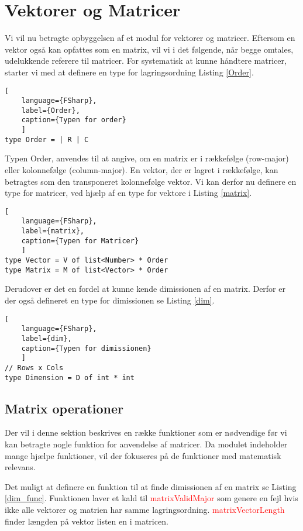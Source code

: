 \section{Vektorer og Matricer}
Vi vil nu betragte opbyggelsen af et modul for vektorer og matricer. Eftersom en vektor også kan opfattes som en matrix, vil vi i det følgende, når begge omtales, udelukkende referere til matricer. For systematisk at kunne håndtere matricer, starter vi med at definere en type for lagringsordning Listing \ref{Order}.

\begin{lstlisting}[
    language={FSharp}, 
    label={Order}, 
    caption={Typen for order}
    ]
type Order = | R | C
\end{lstlisting}

Typen Order, anvendes til at angive, om en matrix er i rækkefølge (row-major) eller kolonnefølge (column-major). En vektor, der er lagret i rækkefølge, kan betragtes som den transponeret kolonnefølge vektor. Vi kan derfor nu definere en type for matricer, ved hjælp af en type for vektore i Listing \ref{matrix}.

\begin{lstlisting}[
    language={FSharp}, 
    label={matrix}, 
    caption={Typen for Matricer}
    ]
type Vector = V of list<Number> * Order
type Matrix = M of list<Vector> * Order
\end{lstlisting}

Derudover er det en fordel at kunne kende dimissionen af en matrix. Derfor er der også defineret en type for dimissionen se Listing \ref{dim}.

\begin{lstlisting}[
    language={FSharp}, 
    label={dim}, 
    caption={Typen for dimissionen}
    ]
// Rows x Cols
type Dimension = D of int * int
\end{lstlisting}


\subsection{Matrix operationer}
Der vil i denne sektion beskrives en række funktioner som er nødvendige før vi kan betragte nogle funktion for anvendelse af matricer. Da modulet indeholder mange hjælpe funktioner, vil der fokuseres på de funktioner med matematisk relevans.

Det muligt at definere en funktion til at finde dimissionen af en matrix se Listing \ref{dim_func}. Funktionen laver et kald til \textcolor{red}{matrixValidMajor} som genere en fejl hvis ikke alle vektorer og matrien har samme lagringsordning. \textcolor{red}{matrixVectorLength} finder længden på vektor listen en i matricen.

